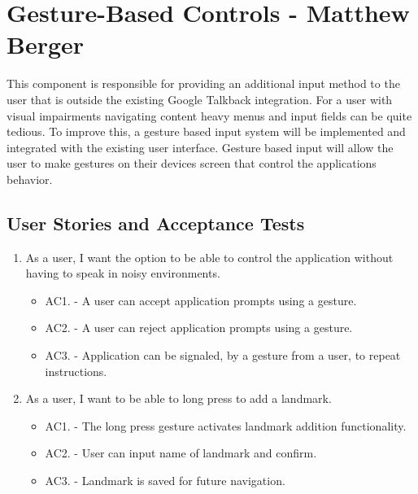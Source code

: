 \documentclass{scrreprt}
\begin{document}
\pagebreak

\section{Gesture-Based Controls - Matthew Berger}

This component is responsible for providing an additional input method to the user that
is outside the existing Google Talkback integration. For a user with visual impairments
navigating content heavy menus and input fields can be quite tedious. To improve this,
a gesture based input system will be implemented and integrated with the existing user
interface. Gesture based input will allow the user to make gestures on their devices
screen that control the applications behavior.

\subsection{User Stories and Acceptance Tests}

\begin{enumerate}
	\item As a user, I want the option to be able to control the application without having
to speak in noisy environments.
	
		\begin{itemize}
			\item AC1. - A user can accept application prompts using a gesture.

			\item AC2. - A user can reject application prompts using a gesture.

			\item AC3. - Application can be signaled, by a gesture from a user, to repeat instructions.
		\end{itemize}
	
	\item As a user, I want to be able to long press to add a landmark.
	
		\begin{itemize}
			\item AC1. - The long press gesture activates landmark addition functionality.

			\item AC2. - User can input name of landmark and confirm.

			\item AC3. - Landmark is saved for future navigation.
		\end{itemize}
\end{enumerate}
\end{document}
